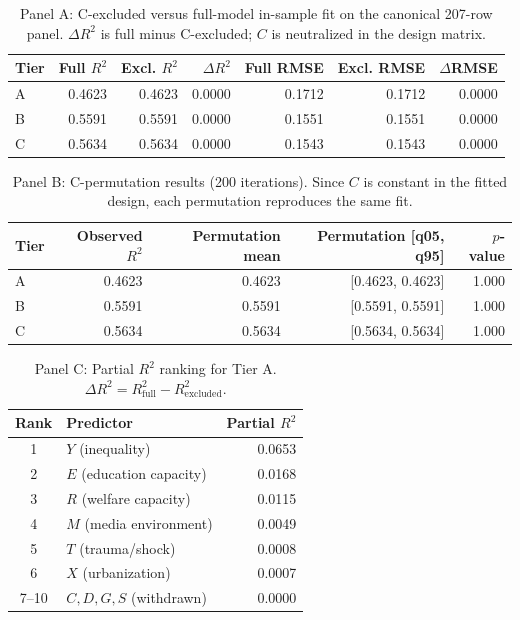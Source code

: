 \documentclass[11pt]{article}
\newcommand{\TableStyle}{%
    \small
    \setlength{\tabcolsep}{2pt}%
    \renewcommand{\arraystretch}{0.9}%
}
\begin{document}
\setcounter{table}{17}%
\begin{table}[!htbp]
\centering
\TableStyle
\caption{Panel A: C-excluded versus full-model in-sample fit on the canonical 207-row panel. $\Delta R^2$ is full minus C-excluded; $C$ is neutralized in the design matrix.}
\label{tab:c-dominance-excluded}
\begin{tabular}{l r r r r r r}
\toprule
Tier & Full $R^2$ & Excl. $R^2$ & $\Delta R^2$ & Full RMSE & Excl. RMSE & $\Delta$RMSE \\
\midrule
A & 0.4623 & 0.4623 & 0.0000 & 0.1712 & 0.1712 & 0.0000 \\
B & 0.5591 & 0.5591 & 0.0000 & 0.1551 & 0.1551 & 0.0000 \\
C & 0.5634 & 0.5634 & 0.0000 & 0.1543 & 0.1543 & 0.0000 \\
\bottomrule
\end{tabular}
\end{table}

\begin{table}[!htbp]
\centering
\TableStyle
\caption*{Panel B: C-permutation results (200 iterations). Since $C$ is constant in the fitted design, each permutation reproduces the same fit.}
\begin{tabular}{l r r r r}
\toprule
Tier & Observed $R^2$ & Permutation mean & Permutation [q05, q95] & $p$-value \\
\midrule
A & 0.4623 & 0.4623 & [0.4623, 0.4623] & 1.000 \\
B & 0.5591 & 0.5591 & [0.5591, 0.5591] & 1.000 \\
C & 0.5634 & 0.5634 & [0.5634, 0.5634] & 1.000 \\
\bottomrule
\end{tabular}
\end{table}

\begin{table}[!htbp]
\centering
\TableStyle
\caption*{Panel C: Partial $R^2$ ranking for Tier A. $\Delta R^2=R^2_{\text{full}}-R^2_{\text{excluded}}$.}
\begin{tabular}{c l r}
\toprule
Rank & Predictor & Partial $R^2$ \\
\midrule
1 & $Y$ (inequality) & 0.0653 \\
2 & $E$ (education capacity) & 0.0168 \\
3 & $R$ (welfare capacity) & 0.0115 \\
4 & $M$ (media environment) & 0.0049 \\
5 & $T$ (trauma/shock) & 0.0008 \\
6 & $X$ (urbanization) & 0.0007 \\
\midrule
7--10 & $C,D,G,S$ (withdrawn) & 0.0000 \\
\bottomrule
\end{tabular}
\end{table}
\end{document}
